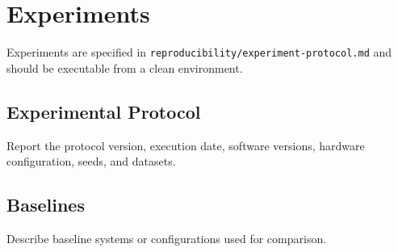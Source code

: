 \section{Experiments}

Experiments are specified in
\texttt{reproducibility/experiment-protocol.md} and should be executable from a
clean environment.

\subsection{Experimental Protocol}

Report the protocol version, execution date, software versions, hardware
configuration, seeds, and datasets.

\subsection{Baselines}

Describe baseline systems or configurations used for comparison.
